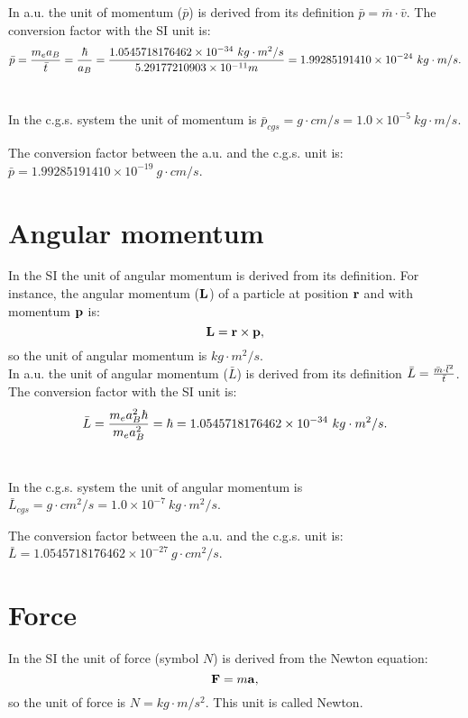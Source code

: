 \documentclass[12pt,a4paper]{article}
\def\hbarf{1.0545718176462\times 10^{-34}}
\def\barl{5.29177210903\times 10^{-11}}
\def\barp{1.99285191410\times 10^{-24}}
\def\ptop{1.0\times 10^{-5}}
\def\ltol{1.0\times 10^{-7}}
\def\barpcgs{1.99285191410\times 10^{-19}}
\def\baramcgs{1.0545718176462\times 10^{-27}}
\begin{document}
{\color{web-blue} In a.u. the unit of momentum ($\bar p$) is derived 
from its definition $\bar p = \bar m \cdot \bar v$. 
The conversion factor with the SI unit is:
\begin{equation}
\bar p = {m_e a_B \over \bar t}= {\hbar \over a_B} =
{\hbarf\ kg\cdot m^2/s \over \barl m}=\barp\ kg\cdot m/s.
\end{equation}
\\ }

{\color{orange} In the c.g.s. system the unit of momentum is 
$\bar p_{cgs}=g\cdot cm/s = \ptop\ kg\cdot m/s$.
\\
}

{\color{green} The conversion factor between the a.u. and the c.g.s. unit is:
$\bar p=\barpcgs\ g\cdot cm/s$.
\\
}

\newpage
\section{\color{coral}Angular momentum}
In the SI the unit of angular momentum is derived from its
definition. For instance, the angular momentum (${\bf L}$) 
of a particle at position ${\bf r}$ and with momentum ${\bf p}$ is:
\begin{equation}
{\bf L}= {{\bf r} \times {\bf p}},
\end{equation} 
so the unit of angular momentum is $kg\cdot m^2/s$.
\\

{\color{web-blue} In a.u. the unit of angular momentum ($\bar L$) is derived 
from its definition
$\bar L = {\bar m \cdot \bar l^2 \over \bar t}$. 
The conversion factor
with the SI unit is:
\begin{equation}
\bar L={m_e a_B^2 \hbar \over m_e a_B^2}=\hbar=
\hbarf\ kg\cdot m^2/s.
\end{equation}
\\
}

{\color{orange} In the c.g.s. system the unit of angular momentum is 
$\bar L_{cgs}=g\cdot cm^2/s = \ltol\ kg\cdot m^2/s$.
\\
}

{\color{green} The conversion factor between the a.u. and the c.g.s. unit is:
$\bar L=\baramcgs\ g\cdot cm^2/s$.
\\
}

\newpage
\section{\color{coral}Force}
In the SI the unit of force (symbol $N$) is derived from  
the Newton equation:
\begin{equation}
{\bf F}= m {\bf a},
\end{equation} 
so the unit of force is $N=kg\cdot m/s^2$. This unit is called Newton.
\\
\end{document}
